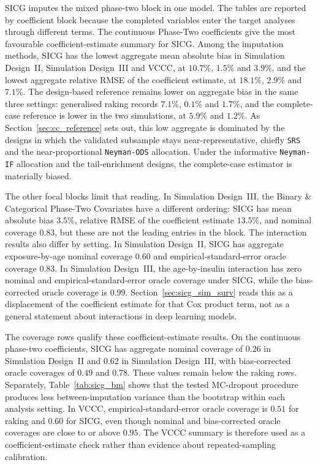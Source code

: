 SICG imputes the mixed phase-two block in one model. The tables are reported by coefficient block because the completed variables enter the target analyses through different terms. The continuous Phase-Two coefficients give the most favourable coefficient-estimate summary for SICG. Among the imputation methods, SICG has the lowest aggregate mean absolute bias in Simulation Design~II, Simulation Design~III and VCCC, at \(10.7\%\), \(1.5\%\) and \(3.9\%\), and the lowest aggregate relative RMSE of the coefficient estimate, at \(18.1\%\), \(2.9\%\) and \(7.1\%\). The design-based reference remains lower on aggregate bias in the same three settings: generalised raking \citep{deville1992calibration} records \(7.1\%\), \(0.1\%\) and \(1.7\%\), and the complete-case reference is lower in the two simulations, at \(5.9\%\) and \(1.2\%\). As Section~\ref{sec:cc_reference} sets out, this low aggregate is dominated by the designs in which the validated subsample stays near-representative, chiefly \texttt{SRS} and the near-proportional \texttt{Neyman-ODS} allocation. Under the informative \texttt{Neyman-IF} allocation and the tail-enrichment designs, the complete-case estimator is materially biased.

The other focal blocks limit that reading. In Simulation Design~III, the Binary \& Categorical Phase-Two Covariates have a different ordering: SICG has mean absolute bias \(3.5\%\), relative RMSE of the coefficient estimate \(13.5\%\), and nominal coverage \(0.83\), but these are not the leading entries in the block. The interaction results also differ by setting. In Simulation Design~II, SICG has aggregate exposure-by-age nominal coverage \(0.60\) and empirical-standard-error oracle coverage \(0.83\). In Simulation Design~III, the age-by-insulin interaction has zero nominal and empirical-standard-error oracle coverage under SICG, while the bias-corrected oracle coverage is \(0.99\). Section~\ref{sec:sicg_sim_surv} reads this as a displacement of the coefficient estimate for that Cox product term, not as a general statement about interactions in deep learning models.

The coverage rows qualify these coefficient-estimate results. On the continuous phase-two coefficients, SICG has aggregate nominal coverage of \(0.26\) in Simulation Design~II and \(0.62\) in Simulation Design~III, with bias-corrected oracle coverages of \(0.49\) and \(0.78\). These values remain below the raking rows. Separately, Table~\ref{tab:sicg_bm} shows that the tested MC-dropout procedure produces less between-imputation variance than the bootstrap within each analysis setting. In VCCC, empirical-standard-error oracle coverage is \(0.51\) for raking and \(0.60\) for SICG, even though nominal and bias-corrected oracle coverages are close to or above \(0.95\). The VCCC summary is therefore used as a coefficient-estimate check rather than evidence about repeated-sampling calibration.

